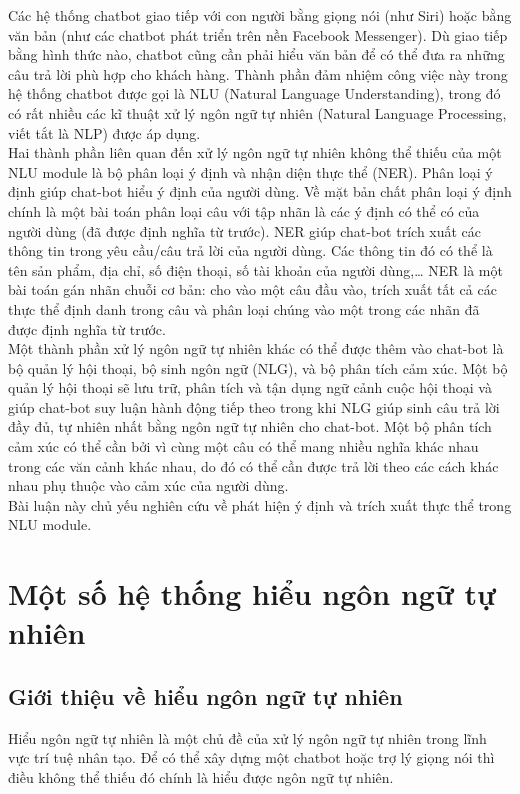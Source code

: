 Các hệ thống chatbot giao tiếp với con người bằng giọng nói (như Siri) hoặc bằng văn bản (như các chatbot phát triển trên nền Facebook Messenger). Dù giao tiếp bằng hình thức nào, chatbot cũng cần phải hiểu văn bản để có thể đưa ra những câu trả lời phù hợp cho khách hàng. Thành phần đảm nhiệm công việc này trong hệ thống chatbot được gọi là NLU (Natural Language Understanding), trong đó có rất nhiều các kĩ thuật xử lý ngôn ngữ tự nhiên (Natural Language Processing, viết tắt là NLP) được áp dụng.
\\
Hai thành phần liên quan đến xử lý ngôn ngữ tự nhiên không thể thiếu của một NLU module là bộ phân loại ý định và nhận diện thực thể (NER). Phân loại ý định giúp chat-bot hiểu ý định của người dùng. Về mặt bản chất phân loại ý định chính là một bài toán phân loại câu với tập nhãn là các ý định có thể có của người dùng (đã được định nghĩa từ trước). NER giúp chat-bot trích xuất các thông tin trong yêu cầu/câu trả lời của người dùng. Các thông tin đó có thể là tên sản phẩm, địa chỉ, số điện thoại, số tài khoản của người dùng,… NER là một bài toán gán nhãn chuỗi cơ bản: cho vào một câu đầu vào, trích xuất tất cả các thực thể định danh trong câu và phân loại chúng vào một trong các nhãn đã được định nghĩa từ trước.
\\
Một thành phần xử lý ngôn ngữ tự nhiên khác có thể được thêm vào chat-bot là bộ quản lý hội thoại, bộ sinh ngôn ngữ (NLG), và bộ phân tích cảm xúc. Một bộ quản lý hội thoại sẽ lưu trữ, phân tích và tận dụng ngữ cảnh cuộc hội thoại và giúp chat-bot suy luận hành động tiếp theo trong khi NLG giúp sinh câu trả lời đầy đủ, tự nhiên nhất bằng ngôn ngữ tự nhiên cho chat-bot. Một bộ phân tích cảm xúc có thể cần bởi vì cùng một câu có thể mang nhiều nghĩa khác nhau trong các văn cảnh khác nhau, do đó có thể cần được trả lời theo các cách khác nhau phụ thuộc vào cảm xúc của người dùng.
\\
Bài luận này chủ yếu nghiên cứu về phát hiện ý định và trích xuất thực thể trong NLU module.

\section{Một số hệ thống hiểu ngôn ngữ tự nhiên}

\subsection{Giới thiệu về hiểu ngôn ngữ tự nhiên}

Hiểu ngôn ngữ tự nhiên là một chủ đề của xử lý ngôn ngữ tự nhiên trong lĩnh vực trí tuệ nhân tạo. Để có thể xây dựng một chatbot hoặc trợ lý giọng nói thì điều không thể thiếu đó chính là hiểu được ngôn ngữ tự nhiên.

